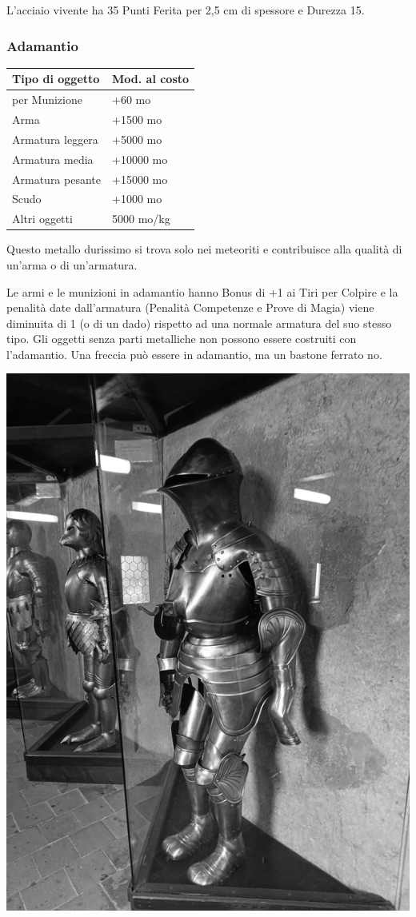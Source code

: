 \begin{multicols}{2}
L'acciaio vivente ha 35 Punti Ferita per 2,5 cm di spessore e Durezza 15.

\subsubsection{Adamantio}

\label{adamantio}

\begin{tabularx}{0.48\textwidth}{Xl}
\textbf{Tipo di oggetto} & \textbf{Mod. al costo}\\
\toprule
per Munizione & +60 mo\\
Arma & +1500 mo\\
Armatura leggera & +5000 mo\\
Armatura media & +10000 mo\\
Armatura pesante & +15000 mo\\
Scudo & +1000 mo\\
Altri oggetti & 5000 mo/kg
\end{tabularx}

\medskip
Questo metallo durissimo si trova solo nei meteoriti e contribuisce alla qualità di un'arma o di un'armatura.

Le armi e le munizioni in adamantio hanno Bonus di +1 ai Tiri per Colpire e la penalità date dall'armatura (Penalità Competenze e Prove di Magia) viene diminuita di 1 (o di un dado) rispetto ad una normale armatura del suo stesso tipo. Gli oggetti senza parti metalliche non possono essere costruiti con l'adamantio. Una freccia può essere in adamantio, ma un bastone ferrato no.

\begin{center}
	\includegraphics[width=0.8\linewidth]{immagini/armature-praga_grayscale.png}


\end{center}
\end{multicols}
